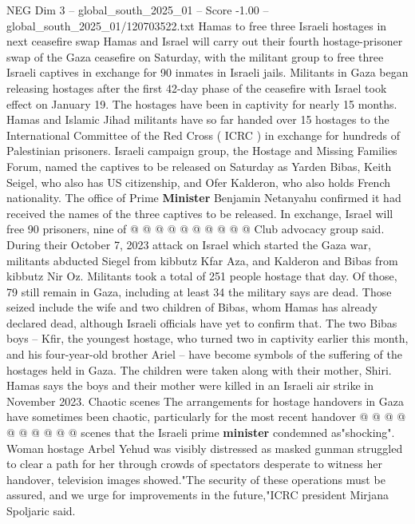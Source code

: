 \begin{textsample}{NEG Dim 3 – global\_south\_2025\_01 – Score -1.00 – global\_south\_2025\_01/120703522.txt}  \label{ex:f3_neg_052}
Hamas to free three Israeli hostages in next ceasefire swap Hamas and Israel will carry out their fourth hostage-prisoner swap of the Gaza ceasefire on Saturday, with the militant group to free three Israeli captives in exchange for 90 inmates in Israeli jails.
Militants in Gaza began releasing hostages after the first 42-day phase of the ceasefire with Israel took effect on January 19.
The hostages have been in captivity for nearly 15 months.
Hamas and Islamic Jihad militants have so far handed over 15 hostages to the International Committee of the Red Cross ( ICRC ) in exchange for hundreds of Palestinian prisoners.
Israeli campaign group, the Hostage and Missing Families Forum, named the captives to be released on Saturday as Yarden Bibas, Keith Seigel, who also has US citizenship, and Ofer Kalderon, who also holds French nationality.
The office of Prime \textbf{Minister} Benjamin Netanyahu confirmed it had received the names of the three captives to be released.
In exchange, Israel will free 90 prisoners, nine of @ @ @ @ @ @ @ @ @ @ Club advocacy group said.
During their October 7, 2023 attack on Israel which started the Gaza war, militants abducted Siegel from kibbutz Kfar Aza, and Kalderon and Bibas from kibbutz Nir Oz.
Militants took a total of 251 people hostage that day.
Of those, 79 still remain in Gaza, including at least 34 the military says are dead.
Those seized include the wife and two children of Bibas, whom Hamas has already declared dead, although Israeli officials have yet to confirm that.
The two Bibas boys -- Kfir, the youngest hostage, who turned two in captivity earlier this month, and his four-year-old brother Ariel -- have become symbols of the suffering of the hostages held in Gaza.
The children were taken along with their mother, Shiri.
Hamas says the boys and their mother were killed in an Israeli air strike in November 2023.
Chaotic scenes The arrangements for hostage handovers in Gaza have sometimes been chaotic, particularly for the most recent handover @ @ @ @ @ @ @ @ @ @ scenes that the Israeli prime \textbf{minister} condemned as"shocking".
Woman hostage Arbel Yehud was visibly distressed as masked gunman struggled to clear a path for her through crowds of spectators desperate to witness her handover, television images showed."The security of these operations must be assured, and we urge for improvements in the future,"ICRC president Mirjana Spoljaric said.

\end{textsample}
